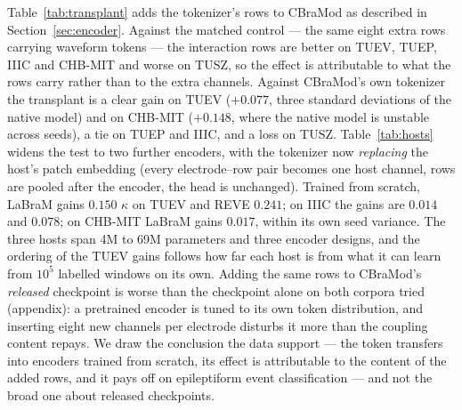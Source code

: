 Table~\ref{tab:transplant} adds the tokenizer's rows to CBraMod as
described in Section~\ref{sec:encoder}. Against the matched control ---
the same eight extra rows carrying waveform tokens --- the interaction
rows are better on TUEV, TUEP, IIIC and CHB-MIT and worse on TUSZ, so
the effect is attributable to what the rows carry rather than to the
extra channels. Against CBraMod's own tokenizer the transplant is a clear
gain on TUEV ($+0.077$, three standard deviations of the native model) and
on CHB-MIT ($+0.148$, where the native model is unstable across seeds), a
tie on TUEP and IIIC, and a loss on TUSZ.
Table~\ref{tab:hosts} widens the test to two further encoders, with
the tokenizer now \emph{replacing} the host's patch embedding (every
electrode--row pair becomes one host channel, rows are pooled after the
encoder, the head is unchanged). Trained from scratch, LaBraM gains
$0.150$ $\kappa$ on TUEV and REVE $0.241$; on IIIC the gains are
$0.014$ and $0.078$; on CHB-MIT LaBraM gains $0.017$, within its own
seed variance. The three hosts span 4M to 69M parameters and three
encoder designs, and the ordering of the TUEV gains follows how far each
host is from what it can learn from $10^5$ labelled windows on its own.
Adding the same rows to CBraMod's \emph{released} checkpoint is worse
than the checkpoint alone on both corpora tried (appendix): a pretrained
encoder is tuned to its own token distribution, and inserting eight new
channels per electrode disturbs it more than the coupling content
repays. We draw the conclusion the data support --- the token transfers
into encoders trained from scratch, its effect is attributable to the
content of the added rows, and it pays off on epileptiform event
classification --- and not the broad one about released checkpoints.

\begin{table}[t]
\centering
\scriptsize
\caption{CroFreMo's rows added to CBraMod's encoder, trained from scratch: the same eight extra rows per electrode carrying waveform tokens (control) or interaction tokens. Native: three seeds; transplants: single seeds.}
\label{tab:transplant}
\end{table}


